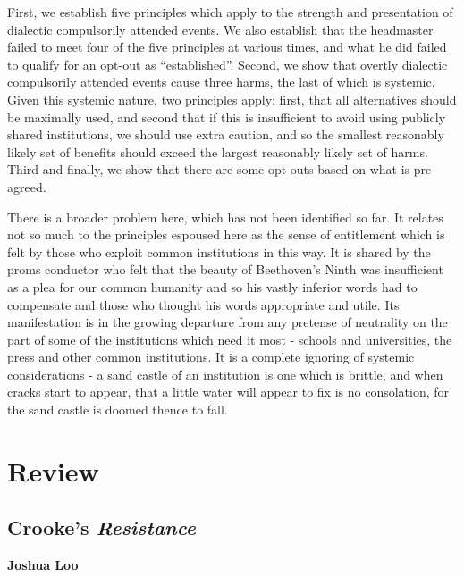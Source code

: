 \documentclass[12pt,a4paper]{report}
\begin{document}
\begin{multicols}{2}
First, we establish five principles which apply to the strength and
presentation of dialectic compulsorily attended events. We also
establish that the headmaster failed to meet four of the five principles
at various times, and what he did failed to qualify for an opt-out as
``established''. Second, we show that overtly dialectic compulsorily
attended events cause three harms, the last of which is systemic. Given
this systemic nature, two principles apply: first, that all alternatives
should be maximally used, and second that if this is insufficient to
avoid using publicly shared institutions, we should use extra caution,
and so the smallest reasonably likely set of benefits should exceed the
largest reasonably likely set of harms. Third and finally, we show that
there are some opt-outs based on what is pre-agreed.

There is a broader problem here, which has not been identified so far.
It relates not so much to the principles espoused here as the sense of
entitlement which is felt by those who exploit common institutions in
this way. It is shared by the proms conductor who felt that the beauty
of Beethoven's Ninth was insufficient as a plea for our common humanity
and so his vastly inferior words had to compensate and those who thought
his words appropriate and utile. Its manifestation is in the growing
departure from any pretense of neutrality on the part of some of the
institutions which need it most - schools and universities, the press
and other common institutions. It is a complete ignoring of systemic
considerations - a sand castle of an institution is one which is
brittle, and when cracks start to appear, that a little water will
appear to fix is no consolation, for the sand castle is doomed thence to
fall.

\end{multicols}

\chapter{Review}

\section{Crooke's \textit{Resistance}}
\textbf{Joshua Loo}
\end{document}
